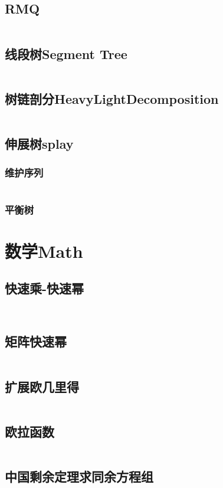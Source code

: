 \documentclass[twoside,sub3section,UTF8]{ctexart}						%
\begin{document}
	\subsection{RMQ}
		\inputminted{c++}{"Data Structure/RMQ.cpp"}
	\subsection{线段树Segment Tree}
		\inputminted{c++}{"Data Structure/segmentTree.cpp"}
	\subsection{树链剖分HeavyLightDecomposition}
		\inputminted{c++}{"Data Structure/HeavyLightDecomposition.cpp"}
	\subsection{伸展树splay}
		\subsubsection{维护序列}
		\inputminted{c++}{"Data Structure/splay.cpp"}
		\subsubsection{平衡树}


\newpage
\section{数学Math}
	
	\subsection{快速乘-快速幂}
	\inputminted{c++}{"Maths/fastmul.cpp"}
	\inputminted{c++}{"Maths/fastpow.cpp"}
	\subsection{矩阵快速幂}
	\inputminted{c++}{"Maths/MatrixFastpow.cpp"}
	\subsection{扩展欧几里得}
	\inputminted{c++}{"Maths/exgcd.cpp"}
	\subsection{欧拉函数}
	\inputminted{c++}{"Maths/Elur.cpp"}
	\subsection{中国剩余定理求同余方程组}
\end{document}
